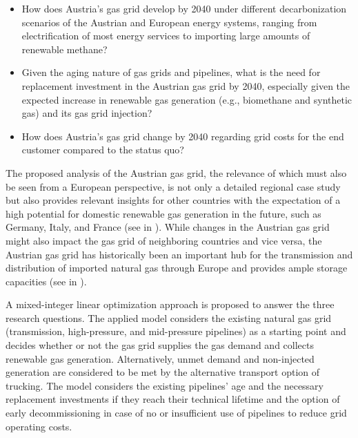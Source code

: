 \begin{itemize}
	\item How does Austria's gas grid develop by 2040 under different decarbonization scenarios of the Austrian and European energy systems, ranging from electrification of most energy services to importing large amounts of renewable methane?
	\item Given the aging nature of gas grids and pipelines, what is the need for replacement investment in the Austrian gas grid by 2040, especially given the expected increase in renewable gas generation (e.g., biomethane and synthetic gas) and its gas grid injection?
	\item How does Austria's gas grid change by 2040 regarding grid costs for the end customer compared to the status quo?
\end{itemize}

The proposed analysis of the Austrian gas grid, the relevance of which must also be seen from a European perspective, is not only a detailed regional case study but also provides relevant insights for other countries with the expectation of a high potential for domestic renewable gas generation in the future, such as Germany, Italy, and France (see in \cite{scarlat2018biogas}). While changes in the Austrian gas grid might also impact the gas grid of neighboring countries and vice versa, the Austrian gas grid has historically been an important hub for the transmission and distribution of imported natural gas through Europe and provides ample storage capacities (see in \cite{sesini2021strategic}).\vspace{0.3cm}

A mixed-integer linear optimization approach is proposed to answer the three research questions. The applied model considers the existing natural gas grid (transmission, high-pressure, and mid-pressure pipelines) as a starting point and decides whether or not the gas grid supplies the gas demand and collects renewable gas generation. Alternatively, unmet demand and non-injected generation are considered to be met by the alternative transport option of trucking. The model considers the existing pipelines' age and the necessary replacement investments if they reach their technical lifetime and the option of early decommissioning in case of no or insufficient use of pipelines to reduce grid operating costs. 

